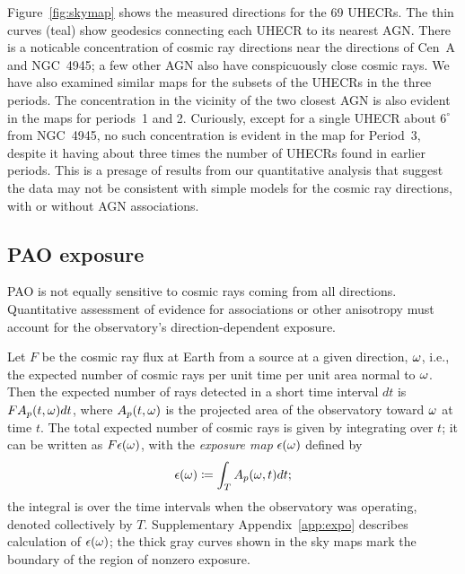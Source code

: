 Figure~\ref{fig:skymap} shows the measured directions for the 69 UHECRs.
The thin curves (teal) show
geodesics connecting each UHECR to its nearest AGN.
There is a noticable concentration of cosmic ray directions near the
directions of Cen~A and NGC~4945; a few other AGN also have conspicuously
close cosmic rays.  We have also examined similar maps for the subsets
of the UHECRs in the three periods.
The concentration in the vicinity of the two closest AGN
is also evident in the maps for periods~1 and 2.
Curiously, except for a single UHECR about $6^\circ$
from NGC~4945, no such concentration is evident in the map for Period~3,
despite it having about three times the number of UHECRs found in earlier
periods.  This is a presage of results from our quantitative analysis that
suggest the data may not be consistent with simple models for the cosmic ray
directions, with or without AGN associations.

\subsection{PAO exposure}

PAO is not equally sensitive to cosmic rays coming from all directions.
Quantitative assessment of evidence for associations or other anisotropy must
account for the observatory's direction-dependent exposure.

Let $F$ be the cosmic ray flux at Earth from a source at a given direction,
$\omega$, i.e., the expected number of cosmic rays per unit time per unit
area normal to $\omega$.   Then the expected number of rays detected in a
short time interval $dt$ is $F A_p(t,\omega) dt$, where $A_p(t,\omega)$ is
the projected area of the observatory toward $\omega$ at time $t$. The total
expected number of cosmic rays is given by integrating over $t$; it can be
written as $F\epsilon(\omega)$, with the {\em exposure map} $\epsilon(\omega)$
defined by
\begin{equation}
\expo(\tdrxn) \coloneqq \int_T  A_p(\tdrxn,t) dt;
\label{expo-def-main}
\end{equation}
the integral is over the time intervals when the observatory was operating,
denoted collectively by $T$.
Supplementary Appendix~\ref{app:expo} describes calculation of
$\epsilon(\omega)$; the thick gray curves shown in the sky maps mark the
boundary of the region of nonzero exposure.
